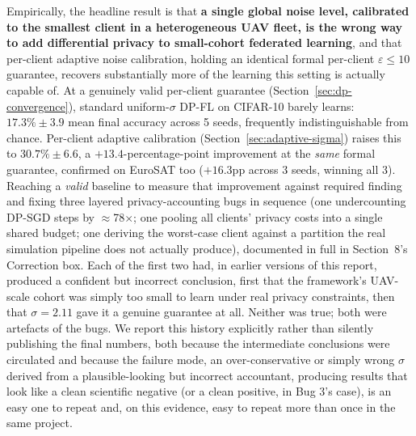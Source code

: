 \documentclass[12pt,a4paper]{article}
\begin{document}
Empirically, the headline result is that \textbf{a single global noise
level, calibrated to the smallest client in a heterogeneous UAV fleet,
is the wrong way to add differential privacy to small-cohort federated
learning}, and that per-client adaptive noise calibration, holding an
identical formal per-client $\varepsilon\le10$ guarantee, recovers
substantially more of the learning this setting is actually capable of.
At a genuinely valid per-client guarantee (Section~\ref{sec:dp-convergence}),
standard uniform-$\sigma$ DP-FL on CIFAR-10 barely learns: $17.3\%\pm3.9$
mean final accuracy across 5 seeds, frequently indistinguishable from
chance. Per-client adaptive calibration (Section~\ref{sec:adaptive-sigma})
raises this to $30.7\%\pm6.6$, a $+13.4$-percentage-point improvement at
the \emph{same} formal guarantee, confirmed on EuroSAT too ($+16.3$pp
across 3 seeds, winning all 3). Reaching a \emph{valid} baseline to
measure that improvement against required finding and fixing three
layered privacy-accounting bugs in sequence (one undercounting DP-SGD
steps by $\approx$78$\times$; one pooling all clients' privacy costs into
a single shared budget; one deriving the worst-case client against a
partition the real simulation pipeline does not actually produce),
documented in full in Section~8's Correction box. Each of the first two
had, in earlier versions of this report, produced a confident but
incorrect conclusion, first that the framework's UAV-scale cohort was
simply too small to learn under real privacy constraints, then that
$\sigma=2.11$ gave it a genuine guarantee at all. Neither was true; both
were artefacts of the bugs. We report this history explicitly rather than
silently publishing the final numbers, both because the intermediate
conclusions were circulated and because the failure mode, an
over-conservative or simply wrong $\sigma$ derived from a plausible-looking
but incorrect accountant, producing results that look like a clean
scientific negative (or a clean positive, in Bug 3's case), is an easy
one to repeat and, on this evidence, easy to repeat more than once in
the same project.
\end{document}
